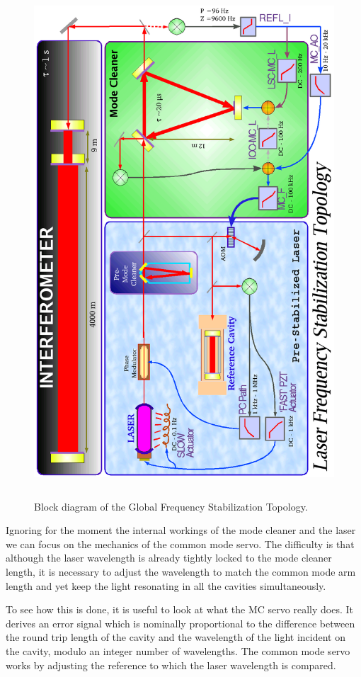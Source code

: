 \begin{figure}[!h]
\centerline{\includegraphics[angle=0,height=7.5in]{Figures/Chap5/CMs90.png}}
\caption[CM Servo Block Diagram]
        {Block diagram of the Global Frequency Stabilization Topology.}
\label{fig:CMblock}
\end{figure}
Ignoring for the moment the internal workings of the mode cleaner and the laser
we can focus on the mechanics of the common mode servo. The difficulty is that
although the laser wavelength is already tightly locked to the mode cleaner
length, it is necessary to adjust the wavelength to match the common mode arm
length and yet keep the light resonating in all the cavities simultaneously.

To see how this is done, it is useful to look at what the MC servo really does.
It derives an error signal which is nominally proportional to the difference
between the round trip length of the cavity and the wavelength of the light
incident on the cavity, modulo an integer number of wavelengths. The common
mode servo works by adjusting the reference to which the laser wavelength
is compared.

